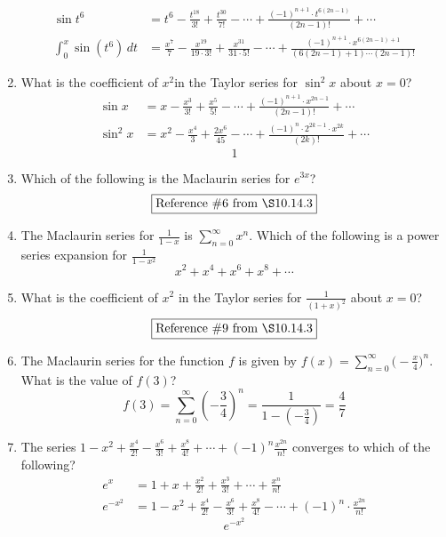 \documentclass[12pt]{article}
\begin{document}
\begin{enumerate}
\begin{align*}
			\sin t^6 &= t^6 - \frac{t^{18}}{3!} + \frac{t^{30}}{7!}- \cdots + \frac{(-1)^{n+1} \cdot t^{6(2n-1)}}{(2n-1)!} + 	\cdots \\
			\int_{0}^{x} \sin (t^6) \, dt &= \boxed{\frac{x^7}{7} - \frac{x^{19}}{19 \cdot 3!} + \frac{x^{31}}{31 \cdot 5!} - \cdots + \frac{(-1)^{n+1}\cdot x^{6(2n-1)+1}}{(6(2n-1)+1)\cdots(2n-1)!}}
		\end{align*}
	\item What is the coefficient of $x^2$in the Taylor series for $\sin^2 x$ about $x=0$?
	\begin{align*}
		\sin x &= x-\frac{x^3}{3!} + \frac{x^5}{5!} - \cdots + \frac{(-1)^{n+1} \cdot x^{2n-1}}{(2n-1)!} + \cdots \\
		\sin^2 x &= x^2 - \frac{x^4}{3} + \frac{2x^6}{45} - \cdots + \frac{(-1)^n \cdot 2^{2k-1} \cdot x^{2k}}{(2k)!} + \cdots
	\end{align*}
	$$\boxed{1}$$
	\item Which of the following is the Maclaurin series for $e^{3x}$?
	$$\boxed{\text{Reference } \# 6 \text{ from } \S 10.14.3}$$
	\item The Maclaurin series for $\frac{1}{1-x}$ is $\sum_{n=0}^{\infty} x^n$. Which of the following is a power series expansion for $\frac{1}{1-x^2}$
	$$\boxed{x^2+x^4+x^6+x^8 +\cdots}$$
	\item What is the coefficient of $x^2$ in the Taylor series for $\frac{1}{(1+x)^2}$ about $x = 0$?
	$$\boxed{\text{Reference } \# 9 \text{ from } \S 10.14.3}$$
	\item The Maclaurin series for the function $f$ is given by $f(x)=\sum_{n=0}^{\infty} \big(-\frac{x}{4}\big)^n$. What is the value of $f(3)$?
	$$f(3) = \sum_{n=0}^{\infty} (-\frac{3}{4})^n = \frac{1}{1- (-\frac{3}{4})} = \boxed{\frac{4}{7}}$$
	\item The series $1-x^2 +\frac{x^4}{2!}- \frac{x^6}{3!}+ \frac{x^8}{4!} + \cdots + (-1)^n\frac{x^{2n}}{n!}$ converges to which of the following?
		\begin{align*}
			e^x		& = 1+ x + \frac{x^2}{2!} + \frac{x^3}{3!} + \cdots + \frac{x^n}{n!} \\
			e^{-x^{2}} 	& = \boxed{1 - x^2 + \frac{x^4}{2!} - \frac{x^6}{3!} + \frac{x^8}{4!} - \cdots + (-1)^n \cdot \frac{x^{2n}}{n!}} 
		\end{align*}
		$$\boxed{e^{-x^{2}}}$$
\end{enumerate}
\end{document}
